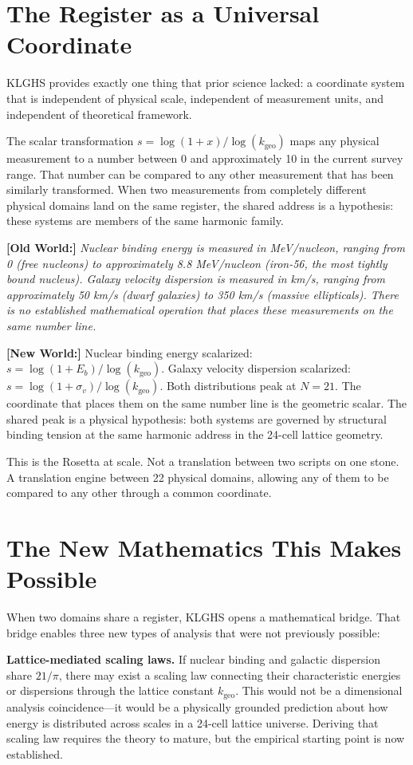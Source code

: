 \documentclass[11pt, letterpaper, openany]{book}
\newcommand{\oldworld}[1]{\noindent\textbf{\color{goldseal}[Old World:]} \textit{#1}\medskip}
\newcommand{\newworld}[1]{\noindent\textbf{\color{kishblue}[New World:]} #1\medskip}
\begin{document}
\section{The Register as a Universal Coordinate}

KLGHS provides exactly one thing that prior science lacked: a coordinate system
that is independent of physical scale, independent of measurement units, and
independent of theoretical framework.

The scalar transformation $s = \log(1+x)/\log(k_\text{geo})$ maps any physical
measurement to a number between 0 and approximately 10 in the current survey range.
That number can be compared to any other measurement that has been similarly
transformed. When two measurements from completely different physical domains land
on the same register, the shared address is a hypothesis: these systems are
members of the same harmonic family.

\oldworld{Nuclear binding energy is measured in MeV/nucleon, ranging from 0 (free
nucleons) to approximately 8.8 MeV/nucleon (iron-56, the most tightly bound
nucleus). Galaxy velocity dispersion is measured in km/s, ranging from
approximately 50 km/s (dwarf galaxies) to 350 km/s (massive ellipticals). There
is no established mathematical operation that places these measurements on the
same number line.}

\newworld{Nuclear binding energy scalarized: $s = \log(1 + E_b)/\log(k_\text{geo})$.
Galaxy velocity dispersion scalarized: $s = \log(1 + \sigma_v)/\log(k_\text{geo})$.
Both distributions peak at $N = 21$. The coordinate that places them on the same
number line is the geometric scalar. The shared peak is a physical hypothesis: both
systems are governed by structural binding tension at the same harmonic address in
the 24-cell lattice geometry.}

This is the Rosetta at scale. Not a translation between two scripts on one stone.
A translation engine between 22 physical domains, allowing any of them to be
compared to any other through a common coordinate.

\section{The New Mathematics This Makes Possible}

When two domains share a register, KLGHS opens a mathematical bridge. That bridge
enables three new types of analysis that were not previously possible:

\textbf{Lattice-mediated scaling laws.} If nuclear binding and galactic dispersion
share $21/\pi$, there may exist a scaling law connecting their characteristic
energies or dispersions through the lattice constant $k_\text{geo}$. This would not
be a dimensional analysis coincidence---it would be a physically grounded prediction
about how energy is distributed across scales in a 24-cell lattice universe. Deriving
that scaling law requires the theory to mature, but the empirical starting point
is now established.
\end{document}
